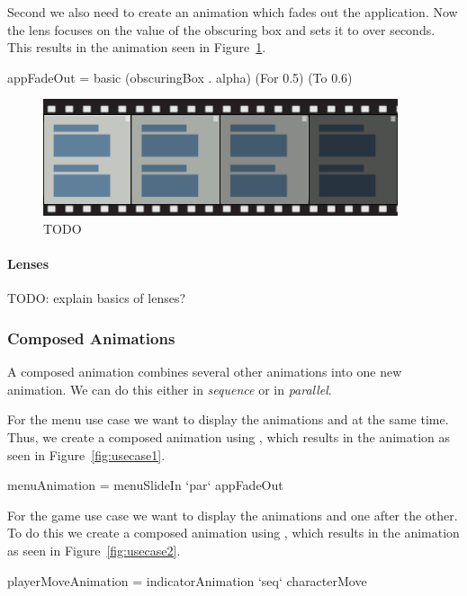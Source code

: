 Second we also need to create an animation which fades out the application. Now the lens focuses on the  value of the obscuring box and sets it to  over  seconds. This results in the animation seen in Figure~\ref{fig:usecase1basic2}.

\begin{code}
appFadeOut = basic (obscuringBox . alpha) (For 0.5) (To 0.6)
\end{code}

\begin{figure}[H]
\centering
\includegraphics[scale=0.4]{pictures/usecase1basic2.png}
\caption{TODO}
\label{fig:usecase1basic2}
\end{figure}

\paragraph{Lenses} TODO: explain basics of lenses?

\subsubsection{Composed Animations}

A composed animation combines several other animations into one new animation. We can do this either in \emph{sequence} or in \emph{parallel}.

For the menu use case we want to display the animations  and  at the same time. Thus, we create a composed animation using ,  which results in the animation as seen in Figure~\ref{fig:usecase1}.

\begin{code}
menuAnimation = menuSlideIn `par` appFadeOut
\end{code}

For the game use case we want to display the animations  and  one after the other. To do this we create a composed animation using , which results in the animation as seen in Figure~\ref{fig:usecase2}.

\begin{code}
playerMoveAnimation = indicatorAnimation `seq` characterMove
\end{code}

